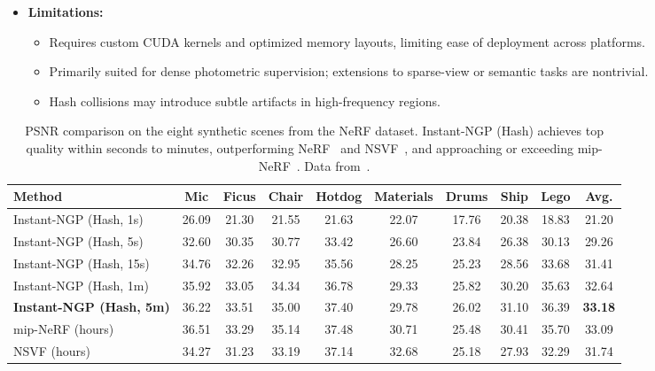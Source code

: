 \begin{enrichment}
\begin{enrichment}
\begin{itemize}
        \item \textbf{Limitations:}
        \begin{itemize}
            \item Requires custom CUDA kernels and optimized memory layouts, limiting ease of deployment across platforms.
            \item Primarily suited for dense photometric supervision; extensions to sparse-view or semantic tasks are nontrivial.
            \item Hash collisions may introduce subtle artifacts in high-frequency regions.
        \end{itemize}
    \end{itemize}
    
    \begin{table}[H]
        \centering
        \caption{PSNR comparison on the eight synthetic scenes from the NeRF dataset. Instant-NGP (Hash) achieves top quality within seconds to minutes, outperforming NeRF~\cite{mildenhall2020_nerf} and NSVF~\cite{liu2020_nsvf}, and approaching or exceeding mip-NeRF~\cite{barron2021_mipnerf}. Data from~\cite{mueller2022_instantngp}.}
        \label{tab:instantngp_psnr}
        \setlength{\tabcolsep}{4pt}
        \renewcommand{\arraystretch}{1.1}
        \begin{tabular}{lcccccccc|c}
            \toprule
            Method & Mic & Ficus & Chair & Hotdog & Materials & Drums & Ship & Lego & Avg. \\
            \midrule
            Instant-NGP (Hash, 1s)  & 26.09 & 21.30 & 21.55 & 21.63 & 22.07 & 17.76 & 20.38 & 18.83 & 21.20 \\
            Instant-NGP (Hash, 5s)  & 32.60 & 30.35 & 30.77 & 33.42 & 26.60 & 23.84 & 26.38 & 30.13 & 29.26 \\
            Instant-NGP (Hash, 15s) & 34.76 & 32.26 & 32.95 & 35.56 & 28.25 & 25.23 & 28.56 & 33.68 & 31.41 \\
            Instant-NGP (Hash, 1m)  & 35.92 & 33.05 & 34.34 & 36.78 & 29.33 & 25.82 & 30.20 & 35.63 & 32.64 \\
            \textbf{Instant-NGP (Hash, 5m)}  & 36.22 & 33.51 & 35.00 & 37.40 & 29.78 & 26.02 & 31.10 & 36.39 & \textbf{33.18} \\
            \midrule
            mip-NeRF (hours)        & 36.51 & 33.29 & 35.14 & 37.48 & 30.71 & 25.48 & 30.41 & 35.70 & 33.09 \\
            NSVF (hours)            & 34.27 & 31.23 & 33.19 & 37.14 & 32.68 & 25.18 & 27.93 & 32.29 & 31.74 \\

\end{tabular}
\end{table}
\end{enrichment}
\end{enrichment}
